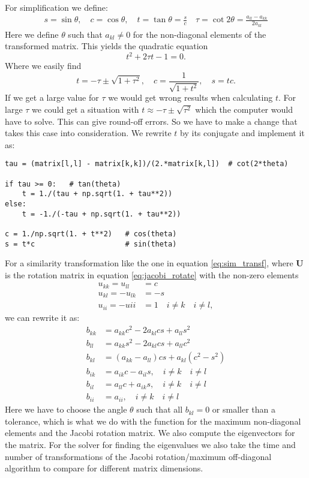 \documentclass[12pt,a4paper,english]{article}
\begin{document}
For simplification we define:
\begin{align*}
s = \sin\theta,\quad c=\cos\theta, \quad t=\tan\theta=\frac{s}{c}\quad \tau=\cot2\theta=\frac{a_{ll}-a_{kk}}{2a_{kl}}
\end{align*}
Here we define $\theta$ such that $a_{kl}\neq0$ for the non-diagonal elements of the transformed matrix. This yields the quadratic equation
\[t^2+2\tau t-1=0.\]
Where we easily find
\[t=-\tau\pm\sqrt{1+\tau^2},\quad c=\frac{1}{\sqrt{1+t^2}},\quad s=tc.\]
If we get a large value for $\tau$ we would get wrong results when calculating $t$. For large $\tau$ we could get a situation with $t\approx-\tau\pm\sqrt{\tau^2}$ which the computer would have to solve. This can give round-off errors. So we have to make a change that takes this case into consideration. We rewrite $t$ by its conjugate and implement it as:
\begin{lstlisting}
tau = (matrix[l,l] - matrix[k,k])/(2.*matrix[k,l])  # cot(2*theta)

if tau >= 0:   # tan(theta)
	t = 1./(tau + np.sqrt(1. + tau**2))
else:
	t = -1./(-tau + np.sqrt(1. + tau**2))

c = 1./np.sqrt(1. + t**2)   # cos(theta)
s = t*c                     # sin(theta)
\end{lstlisting}
For a similarity transformation like the one in equation \ref{eq:sim_transf}, where \textbf{U} is the rotation matrix in equation \ref{eq:jacobi_rotate} with the non-zero elements 
\begin{align*}
u_{kk} = u_{ll} &= c\\
u_{kl} = -u_{lk} &= -s\\
u_{ii} = -u{ii} &= 1\quad i\neq k\quad i\neq l,
\end{align*}
we can rewrite it as:
\begin{align*}
b_{kk} &= a_{kk} c^2 - 2a_{kl}cs + a_{ll} s^2\\
b_{ll} &= a_{kk} s^2 - 2a_{kl}cs + a_{ll} c^2\\
b_{kl} &= (a_{kk} - a_{ll})cs + a_{kl}(c^2-s^2)\\
b_{ik} &= a_{ik}c - a_{il}s, \quad i\neq k\quad i\neq l\\
b_{il} &= a_{ll}c + a_{ik}s, \quad i\neq k\quad i\neq l\\
b_{ii} &= a_{ii}, \quad i\neq k\quad i\neq l
\end{align*}
Here we have to choose the angle $\theta$ such that all $b_{kl}=0$ or smaller than a tolerance, which is what we do with the function for the maximum non-diagonal elements and the Jacobi rotation matrix. We also compute the eigenvectors for the matrix. For the solver for finding the eigenvalues we also take the time and number of transformations of the Jacobi rotation/maximum off-diagonal algorithm to compare for different matrix dimensions.
\end{document}
